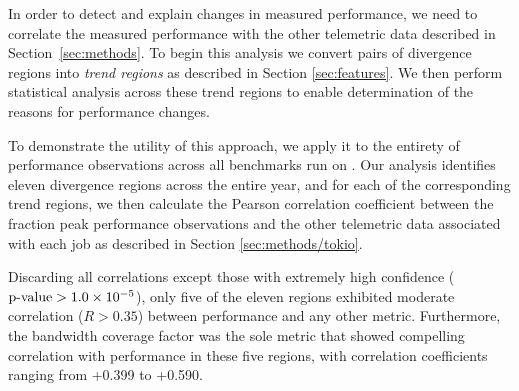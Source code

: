 
In order to detect and explain changes in measured performance, we need to correlate the measured performance with the other telemetric data described in Section~\ref{sec:methods}. To begin this analysis we convert pairs of divergence regions into \emph{trend regions} as described in Section \ref{sec:features}. We then perform statistical analysis across these trend regions to enable determination of the reasons for performance changes. 

%
%

To demonstrate the utility of this approach, we apply it to the entirety of performance observations across all benchmarks run on \mira.
Our analysis identifies eleven divergence regions across the entire year, and for each of the corresponding trend regions, we then calculate the Pearson correlation coefficient between the fraction peak performance observations and the other telemetric data associated with each job as described in Section \ref{sec:methods/tokio}.


Discarding all correlations except those with extremely high confidence ($\textup{p-value} > {1.0 \times 10^{-5}}$), only five of the eleven regions exhibited moderate correlation ($R > 0.35$) between performance and any other metric.
Furthermore, the bandwidth coverage factor was the sole metric that showed compelling correlation with performance in these five regions, with correlation coefficients ranging from +0.399 to +0.590. 

